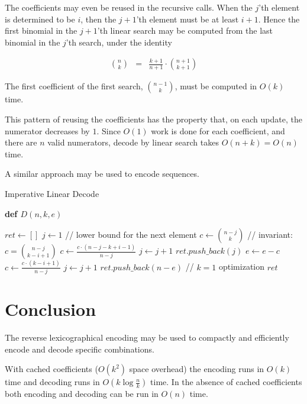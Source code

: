 \documentclass[preprint]{sigplanconf}
\begin{document}
	The coefficients may even be reused in the recursive calls.
	When the $j$'th element is determined to be $i$, then the $j+1$'th element must be at least $i+1$.
	Hence the first binomial in the $j+1$'th linear search may be computed from the last binomial in the $j$'th search, under the identity
	
	\begin{eqnarray*}
		\binom{n}{k} & = & \frac{k+1}{n+1}\cdot\binom{n+1}{k+1}
	\end{eqnarray*}
	
	The first coefficient of the first search, $\binom{n-1}{k}$, must be computed in $O(k)$ time.
	
	This pattern of reusing the coefficients has the property that, on each update, the numerator decreases by $1$.
	Since $O(1)$ work is done for each coefficient, and there are $n$ valid numerators, decode by linear search takes $O(n+k) = O(n)$ time.
	
	A similar approach may be used to encode sequences.
	
	\begin{algorithm}[!ht]
	\caption{Imperative Linear Decode}
	\label{alg:Dil}
	
	\textbf{def $D(n,k,e)$}
	\begin{algorithmic}[1]
	\STATE $ret \gets []$
	\STATE $j \gets 1$ // lower bound for the next element
	\STATE $c \gets \binom{n-j}{k}$ // invariant: $c = \binom{n-j}{k-i+1}$
			\STATE $c \gets \frac{c\cdot (n-j-k+i-1)}{n-j}$
			\STATE $j \gets j + 1$
		\ENDWHILE
		\STATE $ret.push\_back(j)$
		\STATE $e \gets e - c$
		\STATE $c \gets \frac{c \cdot (k-i+1)}{n-j}$
		\STATE $j \gets j + 1$
	\ENDFOR
	\STATE $ret.push\_back(n-e)$ // $k=1$ optimization
	\RETURN $ret$
	\end{algorithmic}	
	
	\end{algorithm}	
	

	\section{Conclusion}
	
	The reverse lexicographical encoding may be used to compactly and efficiently encode and decode specific combinations.
	
	With cached coefficients ($O(k^2)$ space overhead) the encoding runs in $O(k)$ time and decoding runs in $O(k\log\frac{n}{k})$ time.
	In the absence of cached coefficients both encoding and decoding can be run in $O(n)$ time.
	
\end{document}
